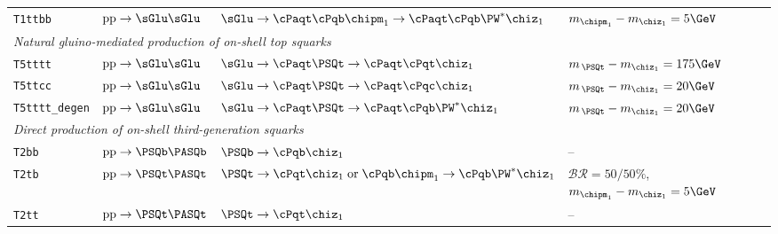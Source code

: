 \begin{table}[tb]
\begin{tabular}{ llll }
\texttt{T1ttbb}        %
                       & $\text{pp}\ra\sGlu\sGlu$      
                       & $\sGlu\ra\cPaqt\cPqb\chipm_1\ra\cPaqt\cPqb\PW^*\chiz_1$
                       & $m_{\chipm_1} - m_{\chiz_1} = 5\GeV$                                           \\ [0.5ex]
\multicolumn{4}{l}{\it Natural gluino-mediated production of on-shell top squarks}                     \\ [0.5ex]
\texttt{T5tttt}        %
                       & $\text{pp}\ra\sGlu\sGlu$      
                       & $\sGlu\ra\cPaqt\PSQt\ra\cPaqt\cPqt\chiz_1$ 
                       & $m_{\,\PSQt} - m_{\chiz_1} = 175\GeV$                                          \\ [0.5ex]
\texttt{T5ttcc}        %
                       & $\text{pp}\ra\sGlu\sGlu$       
                       & $\sGlu\ra\cPaqt\PSQt\ra\cPaqt\cPqc\chiz_1$ 
                       & $m_{\,\PSQt} - m_{\chiz_1} = 20\GeV$                                           \\ [0.5ex]
\texttt{T5tttt\_degen} %
                       & $\text{pp}\ra\sGlu\sGlu$      
                       & $\sGlu\ra\cPaqt\PSQt\ra\cPaqt\cPqb\PW^*\chiz_1$
                       & $m_{\,\PSQt} - m_{\chiz_1} = 20\GeV$                                           \\ [0.5ex]
\multicolumn{4}{l}{\it Direct production of on-shell third-generation squarks}                         \\ [0.5ex]
\texttt{T2bb}          %
                       & $\text{pp}\ra\PSQb\PASQb$     
                       & $\PSQb\ra\cPqb\chiz_1$
                       & --                                                                             \\ [0.5ex]
\texttt{T2tb}          %
                       & $\text{pp}\ra\PSQt\PASQt$     
                       & $\PSQt\ra\cPqt\chiz_1 \;\text{or}\; \cPqb\chipm_1\ra\cPqb\PW^*\chiz_1$
                       & $\mathcal{BR} = 50/50\%$, $m_{\chipm_1} - m_{\chiz_1} = 5\GeV$                 \\ [0.5ex]
\texttt{T2tt}          %
                       & $\text{pp}\ra\PSQt\PASQt$
                       & $\PSQt\ra\cPqt\chiz_1$
                       & --                                                                             \\ [0.5ex]

\end{tabular}
\end{table}
